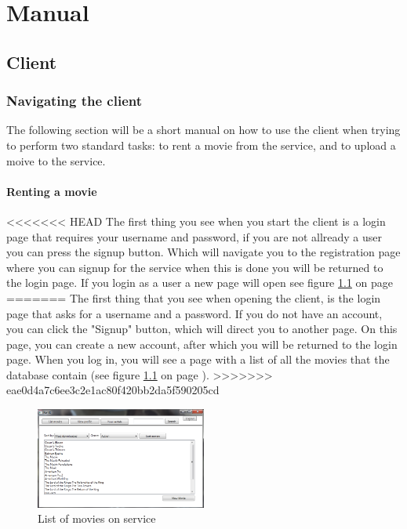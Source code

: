 \chapter{Manual}
\label{Manual}

\section{Client}
\label{Manual_Client}

\subsection{Navigating the client}
\label{Manual_Client_Navigation}
The following section will be a short manual on how to use the client when trying to perform two standard tasks: to rent a movie from the service, and to upload a moive to the service.

\subsubsection{Renting a movie}
\label{Manual_Client_Navigation_Rent}
<<<<<<< HEAD
The first thing you see when you start the client is a login page that requires your username and password, if you are not allready a user you can press the signup button. Which will navigate you to the registration page where you can signup for the service when this is done you will be returned to the login page. If you login as a user a new page will open see figure \ref{fig:Manual_Client_Navigation_Rent_List} on page \pageref{fig:Manual_Client_Navigation_Rent_List}
=======
The first thing that you see when opening the client, is the login page that asks for a username and a password. If you do not have an account, you can click the "Signup" button, which will direct you to another page. On this page, you can create a new account, after which you will be returned to the login page. When you log in, you will see a page with a list of all the movies that the database contain (see figure \ref{fig:Manual_Client_Navigation_Rent_List} on page \pageref{fig:Manual_Client_Navigation_Rent_List}).
>>>>>>> eae0d4a7c6ee3c2e1ac80f420bb2da5f590205cd

\begin{figure}[h!] 
  \centering
 \includegraphics[width=0.5\textwidth]{Parts/Images/Manual/Listmovies}
\caption{List of movies on service}
\label{fig:Manual_Client_Navigation_Rent_List}
\end{figure}
 
